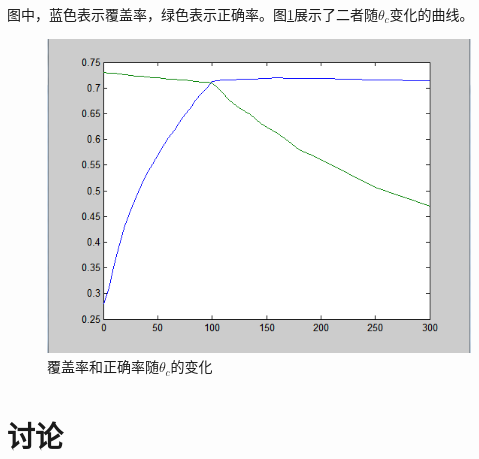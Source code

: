 \documentclass[UTF8]{ctexart}
\begin{document}
图中，蓝色表示覆盖率，绿色表示正确率。图\ref{fig_theta_c}展示了二者随$\theta_c$变化的曲线。

\begin{figure}
\center
\includegraphics[width=0.8 \textwidth]{theta_c_percent.png}
\caption{覆盖率和正确率随$\theta_c$的变化}
\label{fig_theta_c}
\end{figure}




\section{讨论}




\end{document}
